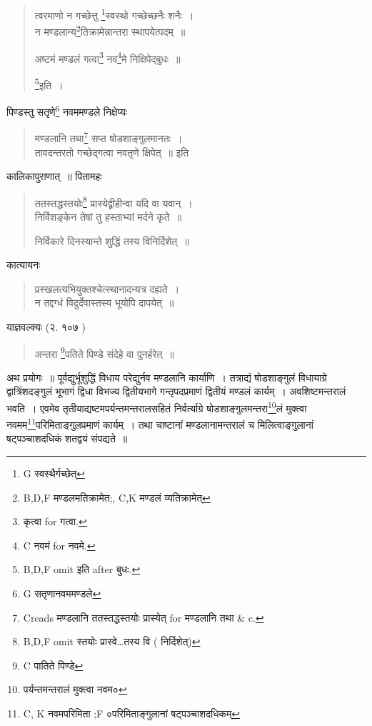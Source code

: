 \documentclass[11pt, openany]{book}
\begin{document}
\begin{quote}
{\vy त्वरमाणो न गच्छेत्तु \renewcommand{\thefootnote}{1}\footnote{G स्वस्थैर्गच्छेत्}स्वस्थो गच्छेच्छनैः शनैः~।\\
न मण्डलान्य\renewcommand{\thefootnote}{2}\footnote{B,D,F मण्डलमतिक्रामेत;, C,K मण्डलं व्यतिक्रामेत्\textendash }तिक्रामेन्नान्तरा स्थापयेत्पदम्~॥

अष्टमं मण्डलं गत्वा\renewcommand{\thefootnote}{3}\footnote{कृत्वा for गत्वा.} नव\renewcommand{\thefootnote}{4}\footnote{C नवमं for नवमे.}मे निक्षिपेद्बुधः~॥} \renewcommand{\thefootnote}{5}\footnote{B,D,F omit इति after बुधः.}इति~।
\end{quote}

पिण्डस्तु सतृणे\renewcommand{\thefootnote}{6}\footnote{G सतृणानवममण्डले} नवममण्डले निक्षेप्यः

\begin{quote}
{\vy मण्डलानि तथा\renewcommand{\thefootnote}{7}\footnote{Creads मण्डलानि ततस्तद्धस्तयोः प्रास्येत् for मण्डलानि तथा \& c.} सप्त षोडशाङ्गुलमानतः~।\\
तावदन्तरतो गच्छेद्गत्वा नवतृणे क्षिपेत्~॥} इति
\end{quote}

कालिकापुराणात्~॥ पितामहः

\begin{quote}
{\vy ततस्तद्धस्तयोः\renewcommand{\thefootnote}{8}\footnote{B,D,F omit स्तयोः प्रास्वे\ldots तस्य वि ( निर्दिशेत्)} प्रास्येद्व्रीहीन्वा यदि वा यवान्~।\\
निर्विशङ्केन तेषां तु हस्ताभ्यां मर्दने कृते~॥

निर्विकारे दिनस्यान्ते शुद्धिं तस्य विनिर्दिशेत्~॥}
\end{quote}

कात्यायनः

\begin{quote}
{\vy प्रस्खलत्यभियुक्तश्चेत्स्थानादन्यत्र दह्यते~।\\
न तद्दग्धं विदुर्देवास्तस्य भूयोपि दापयेत्~॥}
\end{quote}

\newpage
{}

\noindent
याज्ञवल्क्यः (२. १०७ ) 

\begin{quote}
{\vy अन्तरा \renewcommand{\thefootnote}{1}\footnote{C पातिते पिण्डे}पतिते पिण्डे संदेहे वा पुनर्हरेत्~॥}
\end{quote}

अथ प्रयोगः~॥ पूर्वद्युर्भूशुद्धिं विधाय परेद्युर्नव मण्डलानि कार्याणि~। तत्राद्यं षोडशाङ्गुलं विधायाग्रे द्वात्रिंशदङ्गुलं भूभागं द्विधा विभज्य द्वितीयभागे गन्तृपदप्रमाणं द्वितीयं मण्डलं कार्यम्~। अवशिष्टमन्तरालं भवति~। एवमेव तृतीयाद्यष्टमपर्यन्तमन्तरालसहितं निर्वर्त्याग्रे षोडशाङ्गुलमन्तरा\renewcommand{\thefootnote}{2}\footnote{पर्यन्तमन्तरालं मुक्त्वा नवम०}लं मुक्त्वा नवमम\renewcommand{\thefootnote}{3}\footnote{C, K नवमपरिमिता ;F ०परिमिताङ्गुलानां षट्पञ्चाशदधिकम्}परिमिताङ्गुलप्रमाणं कार्यम्~। तथा चाष्टानां मण्डलानामन्तरालं च मिलित्वाङ्गुलानां षट्पञ्चाशदधिकं शतद्वयं संपद्यते~॥
\end{document}
